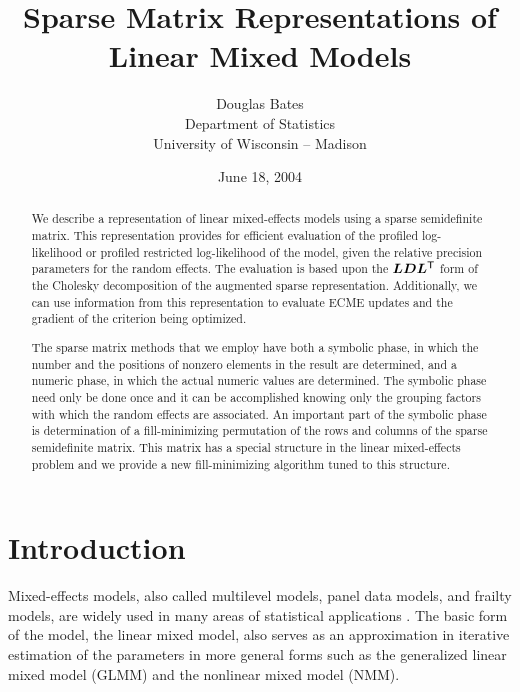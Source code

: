 \documentclass[12pt]{article}
\begin{document}
\title{Sparse Matrix Representations of Linear Mixed Models}
\author{Douglas Bates\\Department of Statistics\\University of
  Wisconsin -- Madison\\}
\date{June 18, 2004}
\maketitle
\begin{abstract}
  We describe a representation of linear mixed-effects models using a
  sparse semidefinite matrix.  This representation provides for efficient
  evaluation of the profiled log-likelihood or profiled restricted
  log-likelihood of the model, given the relative precision parameters
  for the random effects.  The evaluation is based upon the
  $\bm{L}\bm{D}\bm{L}^\mathsf{T}$ form of the Cholesky decomposition of the
  augmented sparse representation.  Additionally, we can use
  information from this representation to evaluate ECME updates and
  the gradient of the criterion being optimized.
  
  The sparse matrix methods that we employ have both a symbolic phase,
  in which the number and the positions of nonzero elements in the
  result are determined, and a numeric phase, in which the actual
  numeric values are determined.  The symbolic phase need only be done
  once and it can be accomplished knowing only the grouping factors
  with which the random effects are associated. An important part of
  the symbolic phase is determination of a fill-minimizing permutation
  of the rows and columns of the sparse semidefinite matrix.  This
  matrix has a special structure in the linear mixed-effects problem
  and we provide a new fill-minimizing algorithm tuned to this
  structure.

\end{abstract}

\section{Introduction}
\label{sec:Intro}

Mixed-effects models, also called multilevel models, panel data
models, and frailty models, are widely used in many areas of
statistical applications \citep{pinh:bate:2000}.  The basic form of
the model, the linear mixed model, also serves as an approximation in
iterative estimation of the parameters in more general forms such as
the generalized linear mixed model (GLMM) and the nonlinear mixed
model (NMM).
\end{document}
